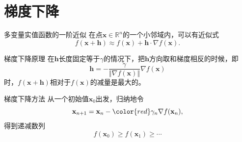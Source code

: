 
\section{梯度下降}


\begin{frame}

\begin{block}{多变量实值函数的一阶近似}
在点$\mathbf{x} \in \mathbb{R}^n$的一个小邻域内，可以有近似式
$$f(\mathbf{x} + \mathbf{h}) \approx f(\mathbf{x}) + \mathbf{h}\cdot\nabla f(\mathbf{x}).$$
\end{block}

\pause

\begin{block}{梯度下降原理}
在$\mathbf{h}$长度固定等于$\gamma$的情况下，把$\mathbf{h}$方向取和梯度相反的时候，即
$$\mathbf{h} = -\dfrac{\gamma}{\left\Vert \nabla f(\mathbf{x}) \right\Vert} \nabla f(\mathbf{x})$$
时，$f(\mathbf{x} + \mathbf{h})$相对于$f(\mathbf{x})$的减量是最大的。
\end{block}

\end{frame}


\begin{frame}

\begin{block}{梯度下降方法}
从一个初始值$\mathbf{x}_0$出发，归纳地令
$$\mathbf{x}_{n+1} = \mathbf{x}_n - {\color{red}\gamma_n} \nabla f(\mathbf{x}_n),$$
得到递减数列
$$f(\mathbf{x}_0) \geqslant f(\mathbf{x}_1) \geqslant \cdots$$
\end{block}

\end{frame}








